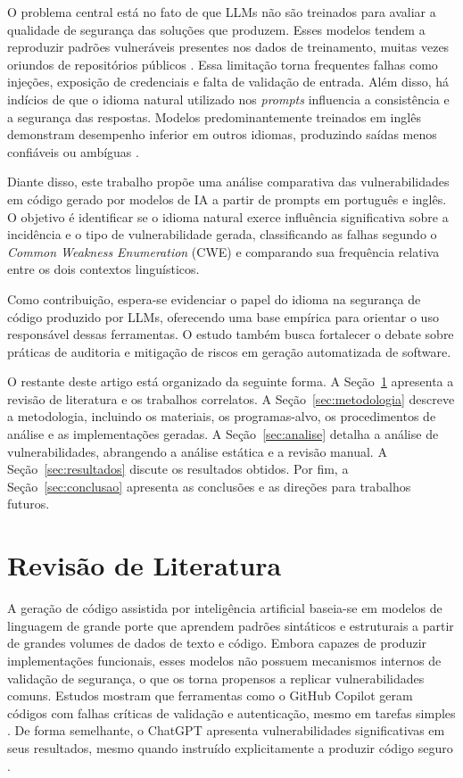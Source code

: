 \documentclass[12pt]{article}
\begin{document}
O problema central está no fato de que LLMs não são treinados para avaliar a qualidade de segurança das soluções que produzem. Esses modelos tendem a reproduzir padrões vulneráveis presentes nos dados de treinamento, muitas vezes oriundos de repositórios públicos \cite{dora2025hiddenrisksllmgeneratedweb}. Essa limitação torna frequentes falhas como injeções, exposição de credenciais e falta de validação de entrada. Além disso, há indícios de que o idioma natural utilizado nos \textit{prompts} influencia a consistência e a segurança das respostas. Modelos predominantemente treinados em inglês demonstram desempenho inferior em outros idiomas, produzindo saídas menos confiáveis ou ambíguas \cite{wang-etal-2024-languages}.

Diante disso, este trabalho propõe uma análise comparativa das vulnerabilidades em código gerado por modelos de IA a partir de prompts em português e inglês. O objetivo é identificar se o idioma natural exerce influência significativa sobre a incidência e o tipo de vulnerabilidade gerada, classificando as falhas segundo o \textit{Common Weakness Enumeration} (CWE) e comparando sua frequência relativa entre os dois contextos linguísticos.

Como contribuição, espera-se evidenciar o papel do idioma na segurança de código produzido por LLMs, oferecendo uma base empírica para orientar o uso responsável dessas ferramentas. O estudo também busca fortalecer o debate sobre práticas de auditoria e mitigação de riscos em geração automatizada de software.

O restante deste artigo está organizado da seguinte forma. A Seção~\ref{sec:revisao} apresenta a revisão de literatura e os trabalhos correlatos. A Seção~\ref{sec:metodologia} descreve a metodologia, incluindo os materiais, os programas-alvo, os procedimentos de análise e as implementações geradas. A Seção~\ref{sec:analise} detalha a análise de vulnerabilidades, abrangendo a análise estática e a revisão manual. A Seção~\ref{sec:resultados} discute os resultados obtidos. Por fim, a Seção~\ref{sec:conclusao} apresenta as conclusões e as direções para trabalhos futuros.

\section{Revisão de Literatura}
\label{sec:revisao}

A geração de código assistida por inteligência artificial baseia-se em modelos de linguagem de grande porte que aprendem padrões sintáticos e estruturais a partir de grandes volumes de dados de texto e código. Embora capazes de produzir implementações funcionais, esses modelos não possuem mecanismos internos de validação de segurança, o que os torna propensos a replicar vulnerabilidades comuns. Estudos mostram que ferramentas como o GitHub Copilot geram códigos com falhas críticas de validação e autenticação, mesmo em tarefas simples \cite{pearce2021asleepkeyboardassessingsecurity}. De forma semelhante, o ChatGPT apresenta vulnerabilidades significativas em seus resultados, mesmo quando instruído explicitamente a produzir código seguro \cite{khoury2023securecodegeneratedchatgpt}.
  
\end{document}
